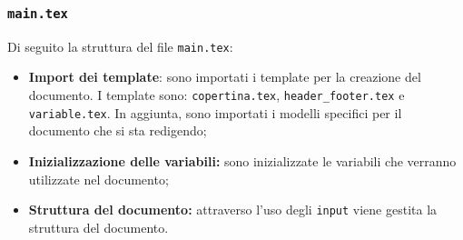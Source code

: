 \vspace{0.5cm}


\subsubsection{\texttt{main.tex}}
Di seguito la struttura del file \texttt{main.tex}:
\begin{itemize}
	\item \textbf{Import dei template}: sono importati i template per la
	      creazione del documento. I template sono: \texttt{copertina.tex},
	      \texttt{header\_footer.tex} e \texttt{variable.tex}. In aggiunta, sono
	      importati i modelli specifici per il documento che si sta redigendo;

	\item \textbf{Inizializzazione delle variabili:} sono inizializzate le
	      variabili che verranno utilizzate nel documento;

	\item \textbf{Struttura del documento:} attraverso l'uso degli
	      \texttt{input} viene gestita la struttura del documento.
\end{itemize}

